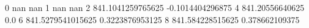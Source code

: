 0 nan nan
1 nan nan
2 841.1041259765625 -0.1014404296875
4 841.20556640625 0.0
6 841.5279541015625 0.3223876953125
8 841.584228515625 0.378662109375
